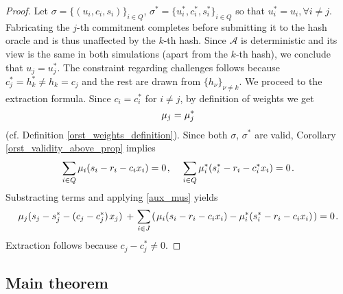 \documentclass{iacrtrans}
\begin{document}
\begin{proof}
Let $\sigma = \{(u_i, c_i, s_i)\}_{i \in Q}$,
$\sigma^* = \{u_i^*, c_i^*, s_i^*\}_{i \in Q}$ so that
$u_i^* = u_i,\forall i \neq j$.
Fabricating the $j$-th commitment completes
before submitting it to the hash oracle
and is thus unaffected by the $k$-th hash.
Since $\mathcal{A}$ is deterministic and its view is
the same in both simulations (apart from the $k$-th hash),
we conclude that $u_j = u_j^*$.
The constraint regarding challenges follows because
$c_j^* = h_k^* \neq h_k = c_j$
and the rest are drawn from $\{h_\nu\}_{\nu \neq k}$.
We proceed to the extraction formula.
Since $c_i = c^*_i$ for $i \neq j$,
by definition of weights we get
\vspace{2pt}
\begin{equation}\label{aux_mus}
\mu_j = \mu^*_j
\vspace{2pt}
\end{equation}
(cf. Definition \ref{orst_weights_definition}).
Since both $\sigma$, $\sigma^*$ are valid, Corollary
\ref{orst_validity_above_prop} implies
\vspace{5pt}
\begin{equation*}
\sum_{i \in Q} \mu_i (s_i - r_i - c_i x_i) = 0\hspace{1pt},
\hspace{12pt}
\sum_{i \in Q} \mu_i^* (s_i^* - r_i - c_i^* x_i) = 0\hspace{1pt}.
\vspace{5pt}
\end{equation*}
Substracting terms and applying \eqref{aux_mus} yields
\vspace{5pt}
\begin{equation*}
\mu_j (s_j - s_j^* - (c_j - c_j^*)\hspace{1pt} x_j)
\hspace{2pt}
+
\hspace{1pt}
\sum_{i \in J}\hspace{1pt}
(
\hspace{1pt}
\mu_i (s_i - r_i - c_i x_i)
-
\mu_i^* (s_i^* - r_i - c_i x_i)
\hspace{1pt}
)
=
0\hspace{1pt}.
\vspace{5pt}
\end{equation*}
Extraction follows because $c_j - c_j^* \neq 0$.
\vspace{0pt}
\end{proof}

\subsection{Main theorem}\label{section_main_theorem}
\end{document}
